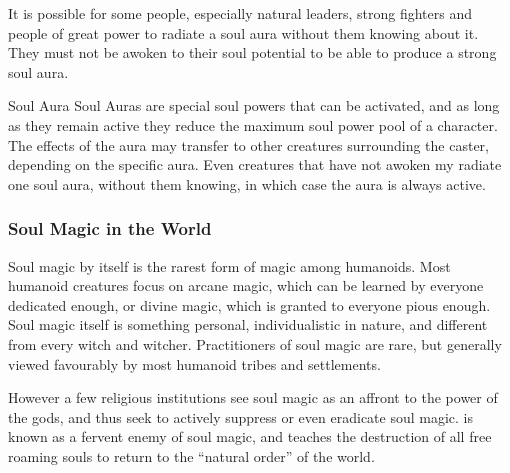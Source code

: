 It is possible for some people, especially natural leaders, strong fighters
and people of great power to radiate a soul aura without them knowing about it.
They must not be awoken to their soul potential to be able to produce a strong
soul aura.

\begin{35e}{Soul Aura}
  Soul Auras are special soul powers that can be activated, and as long as
  they remain active they reduce the maximum soul power pool of a character. The
  effects of the aura may transfer to other creatures surrounding the caster,
  depending on the specific aura. Even creatures that have not awoken my radiate
  one soul aura, without them knowing, in which case the aura is always active.
\end{35e}

\subsubsection{Soul Magic in the World}
\label{sec:Soul Magic in the World}

Soul magic by itself is the rarest form of magic among humanoids. Most humanoid
creatures focus on arcane magic, which can be learned by everyone dedicated
enough, or divine magic, which is granted to everyone pious enough. Soul magic
itself is something personal, individualistic in nature, and different from
every witch and witcher. Practitioners of soul magic are rare, but generally
viewed favourably by most humanoid tribes and settlements.

However a few religious institutions see soul magic as an affront to the power
of the gods, and thus seek to actively suppress or even eradicate soul magic.
 is known as a fervent enemy of soul magic, and teaches the
destruction of all free roaming souls to return to the ``natural order'' of
the world.
